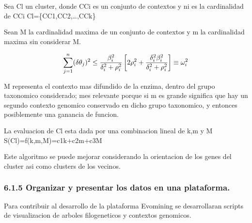 \documentclass[12pt,twoside]{reedthesis}
\begin{document}
  Sea Cl un cluster, donde CCi es un conjunto de contextos y ni es la
  cardinalidad de CCi Cl=\{CC1,CC2,\ldots{},CCk\}
  
  Sean M la cardinalidad maxima de un conjunto de contextos y m la
  cardinalidad maxima sin considerar M.
  
  \begin{Shaded}
  \begin{Highlighting}[]
  \end{Highlighting}
  \end{Shaded}
  
  \[\sum_{j=1}^n (\delta\theta_j)^2 \leq {{\beta_i^2}\over{\delta_i^2 + \rho_i^2}}
  \left[ 2\rho_i^2 + {\delta_i^2\beta_i^2\over{\delta_i^2 + \rho_i^2}} \right] \equiv \omega_i^2
  \]
  
  M representa el contexto mas difundido de la enzima, dentro del grupo
  taxonomico considerado; mes relevante porque si m es grande significa
  que hay un segundo contexto genomico conservado en dicho grupo
  taxonomico, y entonces posiblemente una ganancia de funcion.
  
  La evaluacion de Cl esta dada por una combinacion lineal de k,m y M\\
  S(Cl)=f(k,m,M)=c1k+c2m+c3M
  
  Este algoritmo se puede mejorar considerando la orientacion de los genes
  del cluster asi como clusters de los vecinos.
  
  \subsubsection{6.1.5 Organizar y presentar los datos en una
  plataforma.}\label{organizar-y-presentar-los-datos-en-una-plataforma.}
  
  Para contribuir al desarrollo de la plataforma Evomining se
  desarrollaran scripts de visualizacion de arboles filogeneticos y
  contextos genomicos.
  
\end{document}
